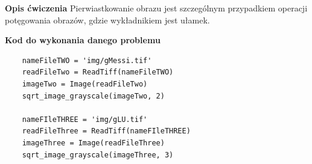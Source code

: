\documentclass[magisterska,openany]{pracadypl}
\begin{document}
\vspace{0.5cm}\textbf{\Large Opis ćwiczenia}
\vspace{0.25cm}\newline
Pierwiastkowanie obrazu jest szczególnym przypadkiem operacji potęgowania obrazów,
gdzie wykładnikiem jest ułamek.
\newline
\newline

\vspace{0.5cm}
\textbf{\Large Kod do wykonania danego problemu}
\lstset{language=Python}
\vspace{0.25cm}
\begin{lstlisting}
	nameFileTWO = 'img/gMessi.tif'
	readFileTwo = ReadTiff(nameFileTWO)
	imageTwo = Image(readFileTwo)
	sqrt_image_grayscale(imageTwo, 2)
	
	nameFIleTHREE = 'img/gLU.tif'
	readFileThree = ReadTiff(nameFIleTHREE)
	imageThree = Image(readFileThree)
	sqrt_image_grayscale(imageThree, 3)

\end{lstlisting}
\newpage
\end{document}
